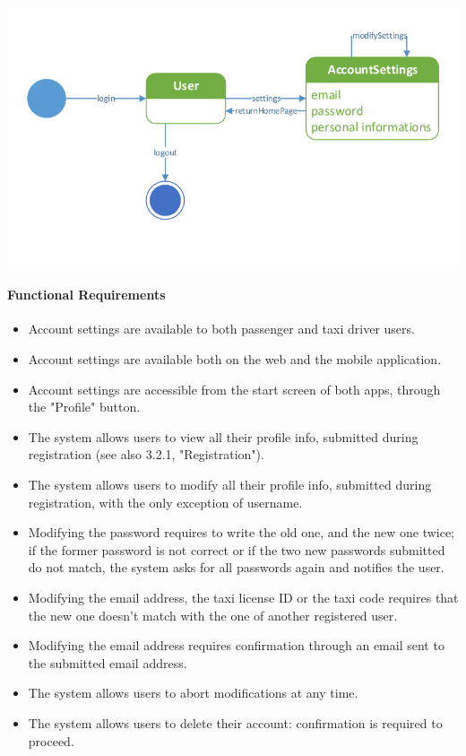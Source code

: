 			\begin{center}
				\includegraphics[width=\textwidth]{diagrams/settings}
			\end{center}
	
	\paragraph{Functional Requirements}
		\begin{itemize}
			\item Account settings are available to both passenger and taxi driver users.
			\item Account settings are available both on the web and the mobile application.
			\item Account settings are accessible from the start screen of both apps, through the "Profile" button.
			\item The system allows users to view all their profile info, submitted during registration (see also 3.2.1, "Registration").
			\item The system allows users to modify all their profile info, submitted during registration, with the only exception of username.
			\item Modifying the password requires to write the old one, and the new one twice; if the former password is not correct or if the two new passwords submitted do not match, the system asks for all passwords again and notifies the user.
			\item Modifying the email address, the taxi license ID or the taxi code requires that the new one doesn't match with the one of another registered user.
			\item Modifying the email address requires confirmation through an email sent to the submitted email address.
			\item The system allows users to abort modifications at any time.
			\item The system allows users to delete their account: confirmation is required to proceed.
		\end{itemize}
